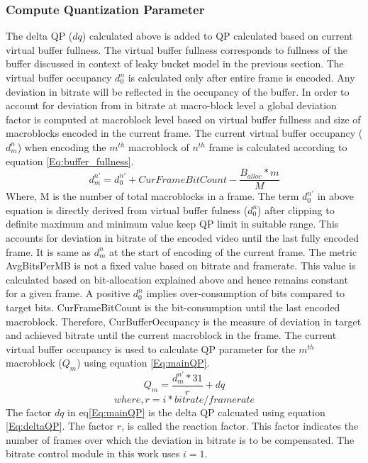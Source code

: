 \documentclass[11pt]{article} %
\begin{document}
\subsubsection{Compute Quantization Parameter}
	The delta QP ($dq$) calculated above is added to QP calculated based on current virtual buffer fullness. The virtual buffer fullness corresponds to fullness of the buffer discussed in context of leaky bucket model in the previous section. The virtual buffer occupancy $d_0^n$ is calculated only after entire frame is encoded. Any deviation in bitrate will be reflected in the occupancy of the buffer. In order to account for deviation from in bitrate at macro-block level a global deviation factor is computed at macroblock level based on virtual buffer fullness and size of macroblocks encoded in the current frame. The current virtual buffer occupancy ($d_m^n$) when encoding the $m^{th}$ macroblock of $n^{th}$ frame is calculated according to equation \ref{Eq:buffer_fullness}.
\begin{equation}
	\label{Eq:buffer_fullness}
	d_m^{n'} = d_0^{n'} + CurFrameBitCount - \frac{B_{alloc} * m}{M}
\end{equation}	
Where, M is the number of total macroblocks in a frame. The term $d_0^{n'}$ in above equation is directly derived from virtual buffer fulness ($d_0^n$) after clipping to definite maximum and minimum value keep QP limit in suitable range. This accounts for deviation in bitrate of the encoded video until the last fully encoded frame. It is same as $d_m^n$ at the start of encoding of the current frame. The metric AvgBitsPerMB is not a fixed value based on bitrate and framerate. This value is calculated based on bit-allocation explained above and hence remains constant for a given frame. A positive $d_0^n$ implies over-consumption of bits compared to target bits. CurFrameBitCount is the bit-consumption until the last encoded macroblock. Therefore, CurBufferOccupancy is the measure of deviation in target and achieved bitrate until the current macroblock in the frame. The current virtual buffer occupancy is used to calculate QP parameter for the $m^{th}$ macroblock ($Q_m$) using equation \ref{Eq:mainQP}.
\begin{equation}
	\label{Eq:mainQP}
	Q_m = \frac{d_m^{n'} * 31}{r} + dq
\end{equation}
\begin{equation}
 where, r = i * bitrate/framerate \nonumber
\end{equation}
The factor $dq$ in eq\ref{Eq:mainQP} is the delta QP calcuated using equation \ref{Eq:deltaQP}. The factor $r$, is called the reaction factor. This factor indicates the number of frames over which the deviation in bitrate is to be compensated. The bitrate control module in this work uses $i = 1$. 
\end{document}
